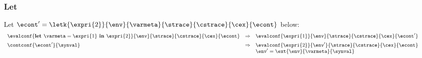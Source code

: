 \documentclass{article}
\begin{document}
\subsubsection{Let}
Let $\econt' = \letk{\expri{2}}{\env}{\varmeta}{\strace}{\cstrace}{\cex}{\econt}$ below:
\[
  \begin{array}{lcl}
	\evalconf{\textbf{let } \varmeta = \expri{1} \textbf{ in } \expri{2}}{\env}{\strace}{\cstrace}{\cex}{\econt}
	& \Rightarrow &
	\evalconf{\expri{1}}{\env}{\strace}{\cstrace}{\cex}{\econt'}\\[2mm]

	\contconf{\econt'}{\synval}
	& \Rightarrow &
	\evalconf{\expri{2}}{\env'}{\strace}{\cstrace}{\cex}{\econt}\\
	&&\env'=\ext{\env}{\varmeta}{\synval}\\[2mm]
  \end{array}
\]
\end{document}
